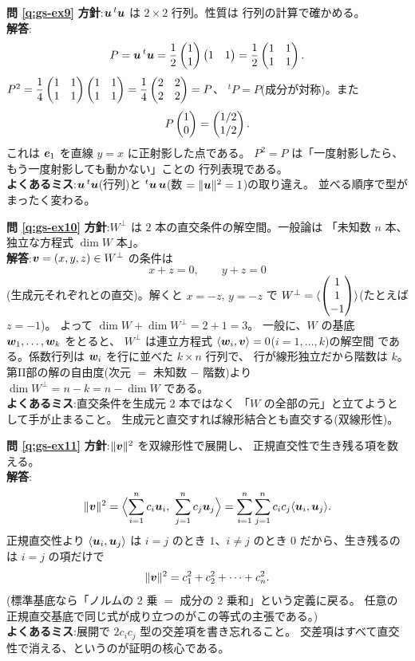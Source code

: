 \bigskip
\noindent\textbf{問 \ref{q:gs-ex9}}\quad
\textbf{方針}:$\bm{u}\,{}^t\bm{u}$ は $2 \times 2$ 行列。性質は
行列の計算で確かめる。\\
\textbf{解答}:
\[
P = \bm{u}\,{}^t\bm{u}
= \frac{1}{2}\begin{pmatrix}1 \\ 1\end{pmatrix}\begin{pmatrix}1 & 1\end{pmatrix} = \frac{1}{2}\begin{pmatrix}1 & 1 \\ 1 & 1\end{pmatrix}.
\]
$P^2 = \dfrac{1}{4}\begin{pmatrix}1 & 1 \\ 1 & 1\end{pmatrix}\begin{pmatrix}1 & 1 \\ 1 & 1\end{pmatrix}
= \dfrac{1}{4}\begin{pmatrix}2 & 2 \\ 2 & 2\end{pmatrix} = P$、
${}^t\!P = P$(成分が対称)。また
\[
P\begin{pmatrix}1 \\ 0\end{pmatrix} = \begin{pmatrix}1/2 \\ 1/2\end{pmatrix}.
\]
これは $\bm{e}_1$ を直線 $y = x$ に正射影した点である。
$P^2 = P$ は「一度射影したら、もう一度射影しても動かない」ことの
行列表現である。\\
\textbf{よくあるミス}:$\bm{u}\,{}^t\bm{u}$(行列)と
${}^t\bm{u}\,\bm{u}$(数 $= \|\bm{u}\|^2 = 1$)の取り違え。
並べる順序で型がまったく変わる。

\bigskip
\noindent\textbf{問 \ref{q:gs-ex10}}\quad
\textbf{方針}:$W^{\perp}$ は $2$ 本の直交条件の解空間。一般論は
「未知数 $n$ 本、独立な方程式 $\dim W$ 本」。\\
\textbf{解答}:$\bm{v} = (x, y, z) \in W^{\perp}$ の条件は
\[
x + z = 0, \qquad y + z = 0
\]
(生成元それぞれとの直交)。解くと $x = -z$, $y = -z$ で
$W^{\perp} = \langle \begin{pmatrix}1 \\ 1 \\ -1\end{pmatrix} \rangle$(たとえば $z = -1$)。
よって $\dim W + \dim W^{\perp} = 2 + 1 = 3$。
一般に、$W$ の基底 $\bm{w}_1, \dots, \bm{w}_k$ をとると、
$W^{\perp}$ は連立方程式
$\langle \bm{w}_i, \bm{v} \rangle = 0$($i = 1, \dots, k$)の解空間
である。係数行列は $\bm{w}_i$ を行に並べた $k \times n$ 行列で、
行が線形独立だから階数は $k$。第II部の解の自由度(次元 $=$ 未知数 $-$
階数)より $\dim W^{\perp} = n - k = n - \dim W$ である。\\
\textbf{よくあるミス}:直交条件を生成元 $2$ 本ではなく
「$W$ の全部の元」と立てようとして手が止まること。
生成元と直交すれば線形結合とも直交する(双線形性)。

\bigskip
\noindent\textbf{問 \ref{q:gs-ex11}}\quad
\textbf{方針}:$\|\bm{v}\|^2$ を双線形性で展開し、
正規直交性で生き残る項を数える。\\
\textbf{解答}:
\[
\|\bm{v}\|^2 = \Bigl\langle \sum_{i=1}^{n} c_i\bm{u}_i,\
\sum_{j=1}^{n} c_j\bm{u}_j \Bigr\rangle
= \sum_{i=1}^{n}\sum_{j=1}^{n} c_ic_j
\langle \bm{u}_i, \bm{u}_j \rangle.
\]
正規直交性より $\langle \bm{u}_i, \bm{u}_j \rangle$ は
$i = j$ のとき $1$、$i \neq j$ のとき $0$ だから、生き残るのは
$i = j$ の項だけで
\[
\|\bm{v}\|^2 = c_1^2 + c_2^2 + \cdots + c_n^2.
\]
(標準基底なら「ノルムの $2$ 乗 $=$ 成分の $2$ 乗和」という定義に戻る。
任意の正規直交基底で同じ式が成り立つのがこの等式の主張である。)\\
\textbf{よくあるミス}:展開で $2c_ic_j$ 型の交差項を書き忘れること。
交差項はすべて直交性で消える、というのが証明の核心である。

